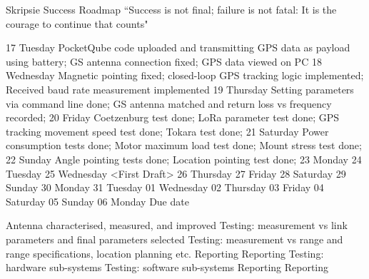 Skripsie Success Roadmap
``Success is not final; failure is not fatal: It is the courage to continue that counts"

17 Tuesday          PocketQube code uploaded and transmitting GPS data as payload using battery; GS antenna connection fixed; GPS data viewed on PC
18 Wednesday        Magnetic pointing fixed; closed-loop GPS tracking logic implemented; Received baud rate measurement implemented
19 Thursday         Setting parameters via command line done; GS antenna matched and return loss vs frequency recorded; 
20 Friday           Coetzenburg test done; LoRa parameter test done; GPS tracking movement speed test done; Tokara test done; 
21 Saturday         Power consumption tests done; Motor maximum load test done; Mount stress test done; 
22 Sunday           Angle pointing tests done; Location pointing test done; 
23 Monday          
24 Tuesday          
25 Wednesday        <First Draft>
26 Thursday         
27 Friday           
28 Saturday         
29 Sunday           
30 Monday           
31 Tuesday          
01 Wednesday        
02 Thursday         
03 Friday           
04 Saturday         
05 Sunday           
06 Monday           Due date

Antenna characterised, measured, and improved
Testing: measurement vs link parameters and final parameters selected
Testing: measurement vs range and range specifications, location planning etc.
Reporting
Reporting
Testing: hardware sub-systems
Testing: software sub-systems
Reporting
Reporting